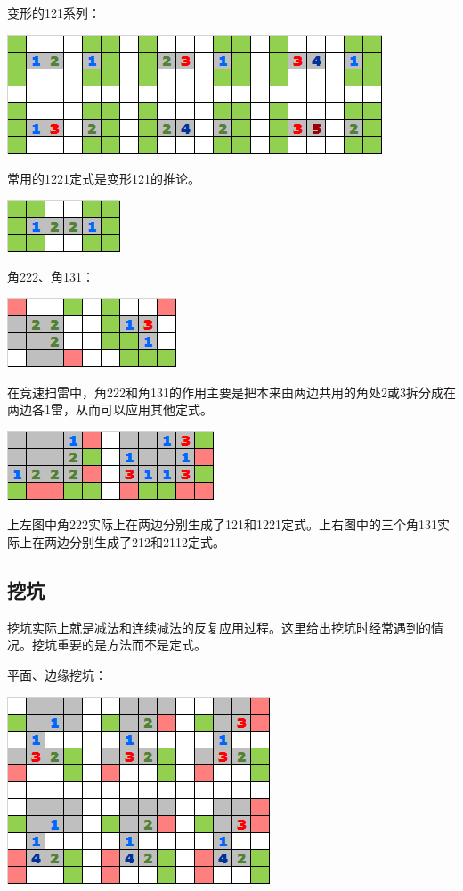 \vspace{5mm}变形的121系列：
\begin{center}
    \includegraphics[scale=0.6]{game/定式4.png}
\end{center}
常用的1221定式是变形121的推论。
\begin{center}
    \includegraphics[scale=0.6]{game/定式7.png}
\end{center}

\vspace{5mm}角222、角131：
\begin{center}
    \includegraphics[scale=0.6]{game/定式5.png}
\end{center}
在竞速扫雷中，角222和角131的作用主要是把本来由两边共用的角处2或3拆分成在两边各1雷，从而可以应用其他定式。
\begin{center}
    \includegraphics[scale=0.6]{game/定式8.png}
\end{center}
上左图中角222实际上在两边分别生成了121和1221定式。上右图中的三个角131实际上在两边分别生成了212和2112定式。

\subsection{挖坑}
挖坑实际上就是减法和连续减法的反复应用过程。这里给出挖坑时经常遇到的情况。挖坑重要的是方法而不是定式。

\vspace{5mm}平面、边缘挖坑：
\begin{center}
    \includegraphics[scale=0.6]{game/挖坑1.png}
\end{center}

